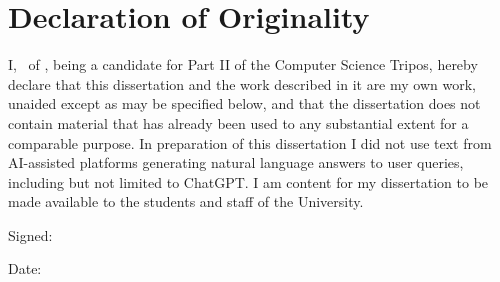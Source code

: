 \documentclass[../00-main.tex]{subfiles}
\begin{document}
\section*{Declaration of Originality}

I, \FullName\ of \College, being a candidate for Part II of the Computer Science Tripos, hereby declare that this dissertation and the work described in it are my own work, unaided except as may be specified below, and that the dissertation does not contain material that has already been used to any substantial extent for a comparable purpose. In preparation of this dissertation I did not use text from AI-assisted platforms generating natural language answers to user queries, including but not limited to ChatGPT\@. I am content for my dissertation to be made available to the students and staff of the University.

\bigskip
Signed: \Signature %

\bigskip
Date: \Date %
\end{document}
